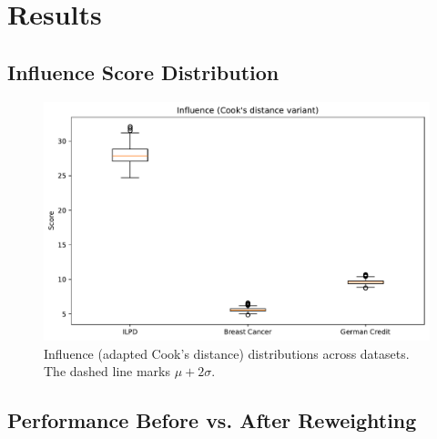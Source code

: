 \documentclass[sn-basic]{sn-jnl} %
\begin{document}
\section{Results}
\subsection{Influence Score Distribution}
\begin{figure}[H]
  \centering
  \includegraphics[width=.9\linewidth]{fig_influence_boxplots.pdf}
  \caption{Influence (adapted Cook's distance) distributions across datasets. The dashed line marks $\mu+2\sigma$.}
  \label{fig:influence}
\end{figure}

\subsection{Performance Before vs. After Reweighting}
\begin{center}
\label{tab:performance}

\end{center}
\end{document}
